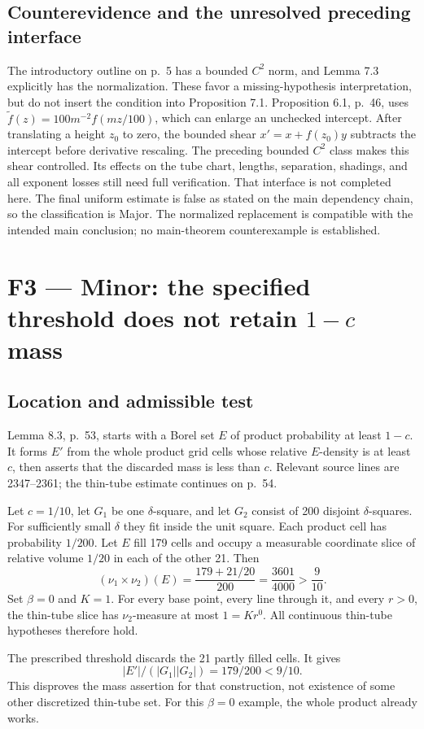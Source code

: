 \documentclass[10pt]{article}
\begin{document}
\subsection*{Counterevidence and the unresolved preceding interface}
The introductory outline on p. 5 has a bounded \(C^2\) norm, and Lemma 7.3 explicitly has the normalization. These favor a missing-hypothesis interpretation, but do not insert the condition into Proposition 7.1. Proposition 6.1, p. 46, uses \(\widetilde f(z)=100m^{-2}f(mz/100)\), which can enlarge an unchecked intercept. After translating a height \(z_0\) to zero, the bounded shear \(x'=x+f(z_0)y\) subtracts the intercept before derivative rescaling. The preceding bounded \(C^2\) class makes this shear controlled. Its effects on the tube chart, lengths, separation, shadings, and all exponent losses still need full verification. That interface is not completed here. The final uniform estimate is false as stated on the main dependency chain, so the classification is Major. The normalized replacement is compatible with the intended main conclusion; no main-theorem counterexample is established.\par
\section*{F3 — Minor: the specified threshold does not retain \(1-c\) mass}
\subsection*{Location and admissible test}
Lemma 8.3, p. 53, starts with a Borel set \(E\) of product probability at least \(1-c\). It forms \(E'\) from the whole product grid cells whose relative \(E\)-density is at least \(c\), then asserts that the discarded mass is less than \(c\). Relevant source lines are 2347–2361; the thin-tube estimate continues on p. 54.\par
Let \(c=1/10\), let \(G_1\) be one \(\delta\)-square, and let \(G_2\) consist of 200 disjoint \(\delta\)-squares. For sufficiently small \(\delta\) they fit inside the unit square. Each product cell has probability \(1/200\). Let \(E\) fill 179 cells and occupy a measurable coordinate slice of relative volume \(1/20\) in each of the other 21. Then \[(\nu_1\times\nu_2)(E)
 =\frac{179+21/20}{200}
 =\frac{3601}{4000}>\frac9{10}.\] Set \(\beta=0\) and \(K=1\). For every base point, every line through it, and every \(r>0\), the thin-tube slice has \(\nu_2\)-measure at most \(1=Kr^0\). All continuous thin-tube hypotheses therefore hold.\par
The prescribed threshold discards the 21 partly filled cells. It gives \[|E'|/(|G_1||G_2|)=179/200<9/10.\] This disproves the mass assertion for that construction, not existence of some other discretized thin-tube set. For this \(\beta=0\) example, the whole product already works.\par
\end{document}
